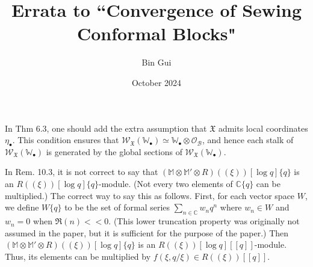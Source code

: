 \documentclass[11pt,b5paper,notitlepage]{article}
\title{Errata to ``Convergence of Sewing Conformal Blocks"}
\author{Bin Gui}
\date{October 2024}
\begin{document}
\maketitle

In Thm 6.3, one should add the extra assumption that $\mathfrak X$ admits local coordinates $\eta_\bullet$. This condition ensures that $\mathscr W_{\mathfrak X}(\mathbb W_\bullet)\simeq \mathbb W_\bullet\otimes\mathscr O_{\mathcal B}$, and hence each stalk of $\mathscr W_{\mathfrak X}(\mathbb W_\bullet)$ is generated by the global sections of $\mathscr W_{\mathfrak X}(\mathbb W_\bullet)$.

In Rem. 10.3, it is not correct to say that $(\mathbb M\otimes\mathbb M'\otimes R)((\xi))[\log q]\{q\}$ is an $R((\xi))[\log q]\{q\}$-module. (Not every two elements of $\mathbb C\{q\}$ can be multiplied.) The correct way to say this as follows. First, for each vector space $W$, we define $W\{q\}$ to be the set of formal series $\sum_{n\in\mathbb C}w_nq^n$ where $w_n\in W$ and $w_n=0$ when $\Re(n)<<0$. (This lower truncation property was originally not assumed in the paper, but it is sufficient for the purpose of the paper.) Then $(\mathbb M\otimes\mathbb M'\otimes R)((\xi))[\log q]\{q\}$ is an $R((\xi))[\log q][[q]]$-module. Thus, its elements can be multiplied by $f(\xi,q/\xi)\in R((\xi))[[q]]$.
\end{document}
